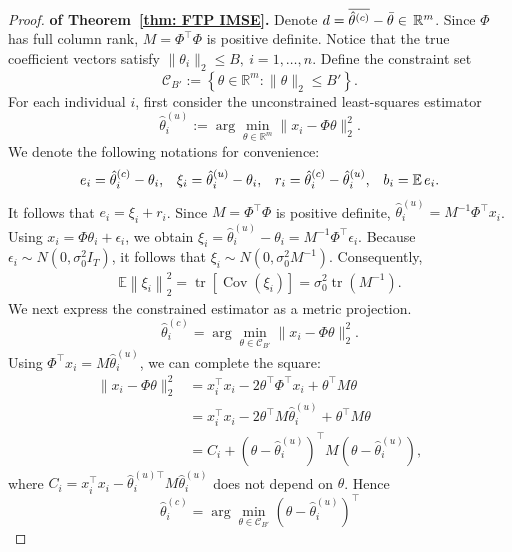 \begin{proof}\textbf{of Theorem~\ref{thm: FTP IMSE}.}
Denote $d=\overline{\hat{\theta}^{(c)}}-\bar{\theta}\in \,{\mathbb{R}}^m$. Since $\Phi$ has full column rank, $M=\Phi^\top \Phi$ is positive
definite. Notice that the true coefficient vectors satisfy
$\|\theta_i\|_2 \leq B, \ i=1,\ldots,n$. Define the constraint set
\[
\mathcal C_{B'}
:=
\left\{
\theta\in\mathbb R^m:\|\theta\|_2\leq B'
\right\}.
\]
For each individual $i$, first consider the unconstrained least-squares
estimator
\[
\hat{\theta}_i^{(u)}
:=
\arg\min_{\theta\in\mathbb R^m}
\|x_i-\Phi\theta\|_2^2.
\]
We denote the following notations for convenience:
\begin{equation*}
    \begin{aligned}
        e_i = \hat{\theta}_i^{(c)} - \theta_i, &&
        \xi_i = \hat{\theta}_i^{(u)} - \theta_i, &&
        r_i = \hat{\theta}_i^{(c)} - \hat{\theta}_i^{(u)}, &&
        b_i = \operatorname*{\mathbb{E}} e_i.
    \end{aligned}
\end{equation*}
It follows that $e_i = \xi_i + r_i$. Since $M=\Phi^\top\Phi$ is positive definite, $\hat{\theta}_i^{(u)} = M^{-1}\Phi^\top x_i$. Using $x_i=\Phi\theta_i+\epsilon_i$, we obtain $\xi_i = \hat{\theta}_i^{(u)}-\theta_i = M^{-1}\Phi^\top\epsilon_i$. Because $\epsilon_i\sim N(0,\sigma_0^2I_T)$, it follows that $\xi_i\sim N(0,\sigma_0^2M^{-1})$. Consequently,
\begin{align}
\mathbb E
\left\|
\xi_i
\right\|_2^2
=
\operatorname{tr}
\left[
\operatorname{Cov}
\left(
\xi_i
\right)
\right]
=
\sigma_0^2\operatorname{tr}(M^{-1}).
\label{eq:unconstrained_mse}
\end{align}
We next express the constrained estimator as a metric projection.
\[
\hat{\theta}_i^{(c)}
=
\arg\min_{\theta\in\mathcal C_{B'}}
\|x_i-\Phi\theta\|_2^2.
\]
Using $\Phi^\top x_i=M\hat{\theta}_i^{(u)}$, we can complete the square:
\begin{align*}
\|x_i-\Phi\theta\|_2^2
&=
x_i^\top x_i
-2\theta^\top\Phi^\top x_i
+\theta^\top M\theta\\
&=
x_i^\top x_i
-2\theta^\top M\hat{\theta}_i^{(u)}
+\theta^\top M\theta\\
&=
C_i+
(\theta-\hat{\theta}_i^{(u)})^\top
M
(\theta-\hat{\theta}_i^{(u)}),
\end{align*}
where 
$C_i = x_i^\top x_i - \hat{\theta}_i^{(u)\top} M\hat{\theta}_i^{(u)}$ 
does not depend on $\theta$. Hence
\begin{equation}
\hat{\theta}_i^{(c)}
=
\arg\min_{\theta\in\mathcal C_{B'}}
(\theta-\hat{\theta}_i^{(u)})^\top

\end{equation}
\end{proof}
